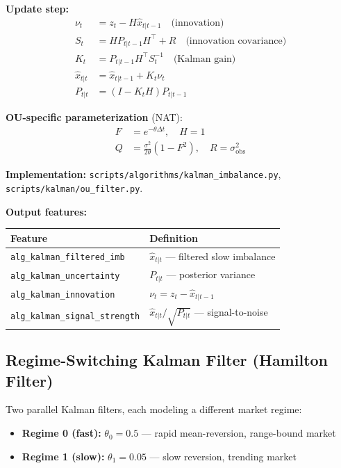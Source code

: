 \documentclass[11pt,a4paper]{article}
\begin{document}
\textbf{Update step:}
\begin{align}
\nu_t &= z_t - H \hat{x}_{t|t-1} \quad \text{(innovation)} \\
S_t &= H P_{t|t-1} H^\top + R \quad \text{(innovation covariance)} \\
K_t &= P_{t|t-1} H^\top S_t^{-1} \quad \text{(Kalman gain)} \\
\hat{x}_{t|t} &= \hat{x}_{t|t-1} + K_t \nu_t \\
P_{t|t} &= (I - K_t H) P_{t|t-1}
\end{align}

\textbf{OU-specific parameterization} (NAT):
\begin{align}
F &= e^{-\theta \Delta t}, \quad H = 1 \\
Q &= \frac{\sigma^2}{2\theta}(1 - F^2), \quad R = \sigma_{\text{obs}}^2
\end{align}

\textbf{Implementation:} \texttt{scripts/algorithms/kalman\_imbalance.py}, \texttt{scripts/kalman/ou\_filter.py}.

\textbf{Output features:}
\begin{center}
\begin{tabular}{l p{8cm}}
\hline
\textbf{Feature} & \textbf{Definition} \\
\hline
\texttt{alg\_kalman\_filtered\_imb} & $\hat{x}_{t|t}$ --- filtered slow imbalance \\
\texttt{alg\_kalman\_uncertainty} & $P_{t|t}$ --- posterior variance \\
\texttt{alg\_kalman\_innovation} & $\nu_t = z_t - \hat{x}_{t|t-1}$ \\
\texttt{alg\_kalman\_signal\_strength} & $\hat{x}_{t|t} / \sqrt{P_{t|t}}$ --- signal-to-noise \\
\hline
\end{tabular}
\end{center}

\subsection{Regime-Switching Kalman Filter (Hamilton Filter)}

Two parallel Kalman filters, each modeling a different market regime:

\begin{itemize}
    \item \textbf{Regime 0 (fast):} $\theta_0 = 0.5$ --- rapid mean-reversion, range-bound market
    \item \textbf{Regime 1 (slow):} $\theta_1 = 0.05$ --- slow reversion, trending market
\end{itemize}
\end{document}
